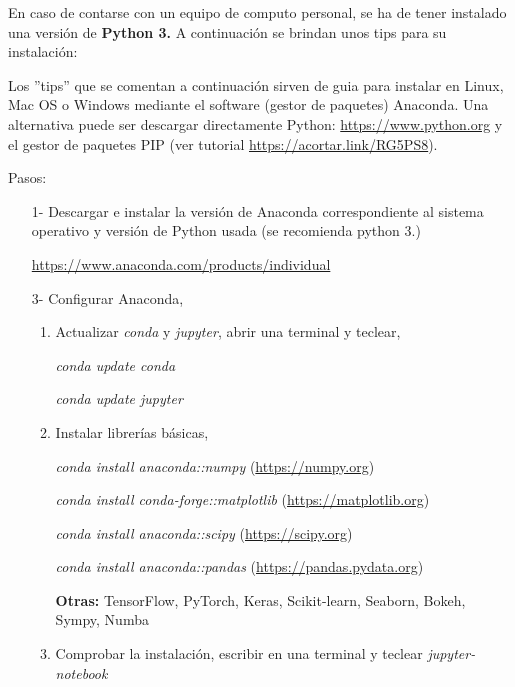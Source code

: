 \documentclass[12pt]{amsart} %
\begin{document}
\vspace*{14pt}
En caso de contarse con un equipo de computo personal, se ha de tener instalado una versión de \textbf{Python 3.} A continuación se brindan unos tips para su instalación:
\vspace{14pt}


\hspace{0.375in} Los ''tips'' que se comentan a continuación sirven de guia para instalar en Linux, Mac OS o Windows mediante el software (gestor de paquetes)  Anaconda. Una alternativa puede ser descargar directamente Python: \url{https://www.python.org} y  el gestor de paquetes PIP (ver tutorial \url{https://acortar.link/RG5PS8}).

\vspace{12pt}

Pasos:
\begin{itemize}
	\item[1-] Descargar e instalar la versión de Anaconda correspondiente al sistema operativo y versión de Python usada (se recomienda python 3.)
	 
	\url{https://www.anaconda.com/products/individual}
	
	\item[3-] Configurar Anaconda,
	
	\begin{enumerate}
		\item Actualizar \textit{conda} y \textit{jupyter}, abrir una terminal y teclear,
			\vspace{8pt}
	
			\emph{conda update conda}
	
			\emph{conda update jupyter}
		\item Instalar librerías básicas,
			\vspace{8pt}
	
			\emph{conda install anaconda::numpy} (\url{https://numpy.org})
	
			\emph{conda install conda-forge::matplotlib} (\url{https://matplotlib.org})
	
			\emph{conda install anaconda::scipy} (\url{https://scipy.org})
	
		\emph{conda install anaconda::pandas} (\url{https://pandas.pydata.org})
	
	\vspace{8pt}
	
	\textbf{Otras:} TensorFlow, PyTorch, Keras, Scikit-learn, Seaborn, Bokeh, Sympy, Numba
	\item Comprobar la instalación, escribir en una terminal y teclear
	\vspace{8pt}
	\emph{jupyter-notebook}
		\end{enumerate}
\end{itemize}
\end{document}
